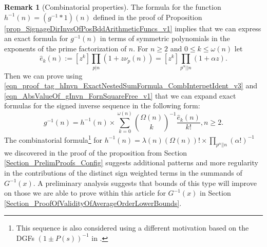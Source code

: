 \documentclass[11pt,reqno,a4letter]{article}
\numberwithin{figure}{section}
\numberwithin{table}{section}
\theoremstyle{plain}
\numberwithin{theorem}{section}
\theoremstyle{definition}
\newtheorem{remark}[theorem]{Remark}
\begin{document}
\begin{remark}[Combinatorial properties]
The formula for the function $h^{-1}(n) = (g^{-1} \ast 1)(n)$ defined in the proof of 
Proposition \ref{prop_SignageDirInvsOfPosBddArithmeticFuncs_v1} implies that we can express 
an exact formula for $g^{-1}(n)$ in terms of symmetric polynomials in the 
exponents of the prime factorization of $n$. 
For $n \geq 2$ and $0 \leq k \leq \omega(n)$ let 
\[
\widehat{e}_k(n) := [z^k] \prod_{p|n} (1 + z \nu_p(n)) = [z^k] \prod_{p^{\alpha} || n} (1 + \alpha z). 
\]
Then we can prove using 
\eqref{eqn_proof_tag_hInvn_ExactNestedSumFormula_CombInterpetIdent_v3} and 
\eqref{eqn_AbsValueOf_gInvn_FornSquareFree_v1} that we can expand exact formulas for 
the signed inverse sequence in the following form: 
\[
g^{-1}(n) = h^{-1}(n) \times \sum_{k=0}^{\omega(n)} \binom{\Omega(n)}{k}^{-1} 
     \frac{\widehat{e}_k(n)}{k!}, n \geq 2. 
\]
The combinatorial formula\footnote{ 
     This sequence is also considered using a different motivation based on the DGFs 
     $(1\pm P(s))^{-1}$ in \cite[\S 2]{FROBERG-1968}. 
} 
for $h^{-1}(n) = \lambda(n) (\Omega(n))! \times \prod_{p^{\alpha} || n} (\alpha !)^{-1}$ 
we discovered in the proof of the proposition from 
Section \ref{Section_PrelimProofs_Config} 
suggests additional patterns and more regularity in the contributions of the distinct sign weighted 
terms in the summands of $G^{-1}(x)$. 
A preliminary analysis suggests that bounds of this type 
will improve on those we are able to prove within this article for $G^{-1}(x)$ in 
Section \ref{Section_ProofOfValidityOfAverageOrderLowerBounds}. 
\end{remark}
\end{document}
